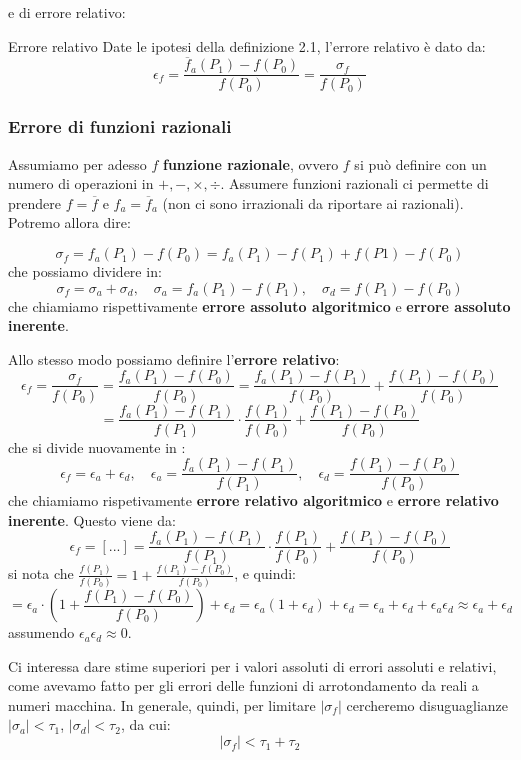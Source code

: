 \documentclass[a4paper,11pt]{article}
\begin{document}
e di errore relativo:
\begin{definition}{Errore relativo}
	Date le ipotesi della definizione 2.1, l'errore relativo è dato da:
	$$
	\epsilon_f = \frac{\overline{f}_a (P_1) - f(P_0)}{f(P_0)} = \frac{\sigma_f}{f(P_0)}
	$$
\end{definition}


\subsubsection{Errore di funzioni razionali}
Assumiamo per adesso $f$ \textbf{funzione razionale}, ovvero $f$ si può definire con un numero di operazioni in $+, -, \times, \div$.
Assumere funzioni razionali ci permette di prendere $f = \overline{f}$ e $f_a = \overline{f}_a$ (non ci sono irrazionali da riportare ai razionali).
Potremo allora dire:

$$
\sigma_f = f_a(P_1) - f(P_0) = f_a(P_1) - f(P_1) + f(P1) - f(P_0)
$$
che possiamo dividere in:
$$
\sigma_f = \sigma_a + \sigma_d, \quad \sigma_a = f_a(P_1) - f(P_1), \quad \sigma_d = f(P_1) - f(P_0)
$$
che chiamiamo rispettivamente \textbf{errore assoluto algoritmico} e \textbf{errore assoluto inerente}.

Allo stesso modo possiamo definire l'\textbf{errore relativo}:
$$
\epsilon_f = \frac{\sigma_f}{f(P_0)} = \frac{f_a(P_1) - f(P_0)}{f(P_0)} = \frac{f_a(P_1) - f(P_1)}{f(P_0)} + \frac{f(P_1) - f(P_0)}{f(P_0)}
$$
$$
= \frac{f_a(P_1) - f(P_1)}{f(P_1)} \cdot \frac{f(P_1)}{f(P_0)} + \frac{f(P_1) - f(P_0)}{f(P_0)} 
$$
che si divide nuovamente in :
$$
\epsilon_f = \epsilon_a + \epsilon_d, \quad \epsilon_a = \frac{f_a(P_1) - f(P_1)}{f(P_1)}, \quad \epsilon_d = \frac{f(P_1) - f(P_0)}{f(P_0)}
$$
che chiamiamo rispetivamente \textbf{errore relativo algoritmico} e \textbf{errore relativo inerente}.
Questo viene da:
$$
\epsilon_f = [...] = \frac{f_a(P_1) - f(P_1)}{f(P_1)} \cdot \frac{f(P_1)}{f(P_0)} + \frac{f(P_1) - f(P_0)}{f(P_0)} 
$$
si nota che $\frac{f(P_1)}{f(P_0)} = 1 + \frac{f(P_1) - f(P_0)}{f(P_0)}$, e quindi:
$$
= \epsilon_a \cdot \left( 1 + \frac{f(P_1) - f(P_0)}{f(P_0)} \right) + \epsilon_d = \epsilon_a(1 + \epsilon_d) + \epsilon_d = \epsilon_a + \epsilon_d + \epsilon_a \epsilon_d \approx \epsilon_a + \epsilon_d
$$
assumendo $\epsilon_a \epsilon_d \approx 0$.

\par\smallskip

Ci interessa dare stime superiori per i valori assoluti di errori assoluti e relativi, come avevamo fatto per gli errori delle funzioni di arrotondamento da reali a numeri macchina.
In generale, quindi, per limitare $|\sigma_f|$ cercheremo disuguaglianze $|\sigma_a| < \tau_1$, $|\sigma_d| < \tau_2$, da cui:
$$
	|\sigma_f| < \tau_1 + \tau_2
$$
\end{document}
